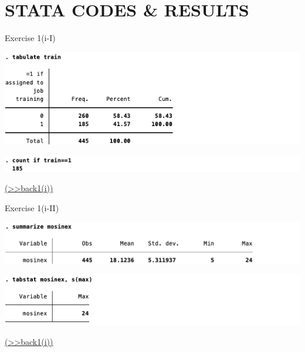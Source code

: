 \documentclass[
  10pt,
  ignorenonframetext,
]{beamer}
\begin{document}
\hypertarget{stata-codes-results}{%
\section{STATA CODES \& RESULTS}\label{stata-codes-results}}

\begin{frame}{Exercise 1(i-I)}
\protect\hypertarget{numtrain}{}
\begin{center}\includegraphics[width=0.9\linewidth]{pictures/numtrain1} \end{center}

\begin{center}\includegraphics[width=0.9\linewidth]{pictures/numtrain2} \end{center}

\footnotesize \protect\hyperlink{1-i}{(\textgreater\textgreater back1(i))}
\normalsize
\end{frame}

\begin{frame}{Exercise 1(i-II)}
\protect\hypertarget{mosinex_max}{}
\begin{center}\includegraphics[width=0.9\linewidth]{pictures/mosinex_max1} \end{center}

\begin{center}\includegraphics[width=0.9\linewidth]{pictures/mosinex_max2} \end{center}

\footnotesize \protect\hyperlink{1-i}{(\textgreater\textgreater back1(i))}
\normalsize
\end{frame}
\end{document}
